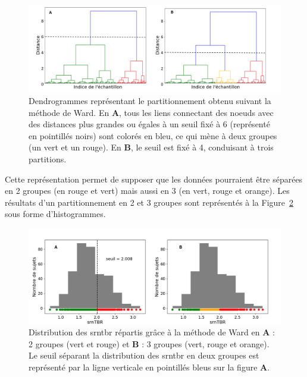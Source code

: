 \begin{figure}[h!]
  \centering
	\includegraphics[width=1\linewidth]{figures/chapter-4/tbr-dendrogram-ward} 
  \caption[Dendrogrammes représentant le partitionnement obtenu suivant la méthode de Ward.]{Dendrogrammes représentant le partitionnement obtenu suivant 
	la méthode de Ward. En \textbf{A}, tous les liens connectant des noeuds 
	avec des distances plus grandes ou égales à un seuil fixé à 6 (représenté en pointillés noirs) sont colorés en bleu, ce qui mène à deux groupes	
	(un vert et un rouge). En \textbf{B}, le seuil est fixé à 4, conduisant à trois partitions.}
  \label{Figure:tbr_ward_dendrogram}
\end{figure}

Cette représentation permet de supposer que les données pourraient être séparées en 2 groupes (en rouge et vert) 
mais aussi en 3 (en vert, rouge et orange). Les résultats d'un partitionnement en 2 et 3 groupes sont représentés 
à la Figure~\ref{Figure:tbr_ward_histograms} sous forme d'histogrammes.

\begin{figure}[h!]
  \centering
	\includegraphics[width=1.0\linewidth]{figures/chapter-4/tbr-histogram-ward} 
  \caption[Résultats du partitionnement en deux et trois groupes selon la méthode de Ward.]{Distribution des \gls{srntbr} répartis grâce à la méthode de Ward en \textbf{A} : 2 groupes (vert et rouge) et \textbf{B} : 3 groupes 
	(vert, rouge et orange). Le seuil séparant la distribution des \gls{srntbr} en deux groupes est représenté par la ligne verticale en pointillés bleus sur la 
	figure \textbf{A}.}
  \label{Figure:tbr_ward_histograms}
\end{figure}

